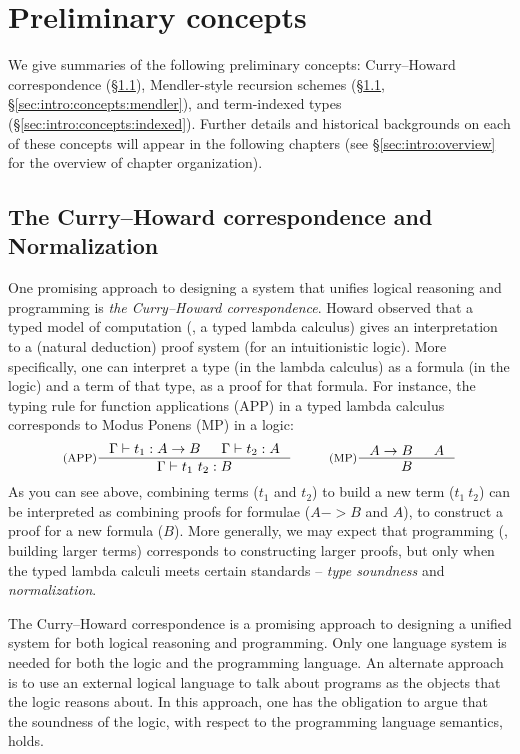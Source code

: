 \section{Preliminary concepts}\label{sec:intro:concepts}
We give summaries of the following preliminary concepts:
Curry--Howard correspondence (\S\ref{sec:intro:concepts:CH}),
Mendler-style recursion schemes
(\S\ref{sec:intro:concepts:CH}, \S\ref{sec:intro:concepts:mendler}),
and term-indexed types (\S\ref{sec:intro:concepts:indexed}).
Further details and historical backgrounds on each of these concepts
will appear in the following chapters (see \S\ref{sec:intro:overview}
for the overview of chapter organization).

\subsection{The Curry--Howard correspondence and Normalization}
\label{sec:intro:concepts:CH}
One promising approach to designing a system that unifies
logical reasoning and programming is \emph{the Curry--Howard correspondence}.
Howard \cite{Howard69} observed that a typed model of computation
(\ie, a typed lambda calculus) gives an interpretation to a (natural deduction)
proof system (for an intuitionistic logic). More specifically, one can interpret
a type (in the lambda calculus) as a formula (in the logic) and
a term of that type, as a proof for that formula. For instance,
the typing rule for function applications (APP) in a typed lambda calculus
corresponds to Modus Ponens (MP) in a logic:
\[ \inference[(APP)]{\Gamma |- t_1 : A -> B & \Gamma |- t_2 : A}{
        \Gamma |- t_1~t_2 : B}
 ~~~~~~~~
   \inference[(MP)]{A -> B & A}{B}
\]
As you can see above, combining terms ($t_1$ and $t_2$) to build a new term
($t_1~t_2$) can be interpreted as combining proofs for formulae
($A -> B$ and $A$), to construct a proof for a new formula ($B$).
More generally, we may expect that programming (\ie, building larger terms)
corresponds to constructing larger proofs, but only when the typed lambda calculi
meets certain standards -- \emph{type soundness} and \emph{normalization}.

The Curry--Howard correspondence is a promising approach to designing a
unified system for both logical reasoning and programming. Only one language
system is needed for both the logic and the programming language. An
alternate approach is to use an external logical language to talk about
programs as the objects that the logic reasons about. In this approach, one
has the obligation to argue that the soundness of the logic, with respect to
the programming language semantics, holds.

